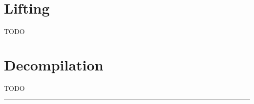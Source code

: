 \section{Lifting} \label{sec:existing-lifting}
TODO


\section{Decompilation} \label{sec:existing-decompilation}
TODO


\noindent\rule{8cm}{0.4pt}

\newpage
